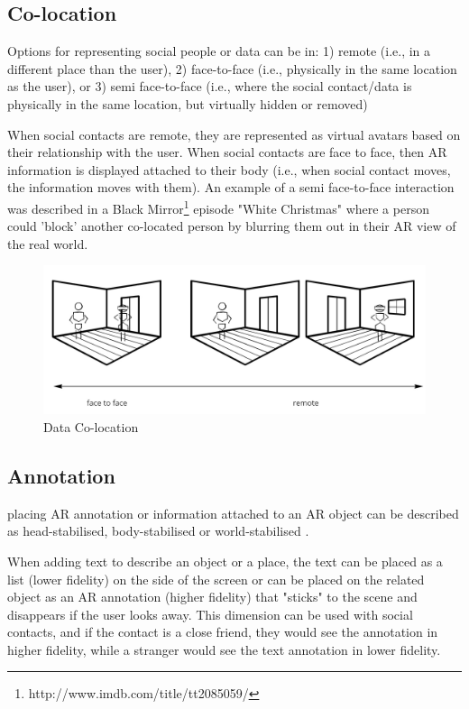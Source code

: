 \subsection{Co-location}

Options for representing social people or data can be in: 
1) remote (i.e., in a different place than the user), 
2) face-to-face (i.e., physically in the same location as the user), or 
3) semi face-to-face (i.e., where the social contact/data is physically in the same location, but virtually hidden or removed)

When social contacts are remote, they are represented as virtual avatars based on their relationship with the user. When social contacts are face to face, then AR information is displayed attached to their body (i.e., when social contact moves, the information moves with them). 
An example of a semi face-to-face interaction was described in a Black Mirror\footnote{http://www.imdb.com/title/tt2085059/} episode "White Christmas" where a person could 'block' another co-located person by blurring them out in their AR view of the real world.

\begin{figure}[h]
    \centering
    \includegraphics[width=.8\linewidth]{images/continuum-colocation.jpg}
    \caption{Data Co-location}
    \label{fig:continuum:data-colocation}
\end{figure}


\subsection{Annotation}

placing AR annotation or information attached to an AR object can be described as head-stabilised, body-stabilised or world-stabilised \cite{Billinghurst1998}.

When adding text to describe an object or a place, the text can be placed as a list (lower fidelity) on the side of the screen or can be placed on the related object as an AR annotation (higher fidelity) that "sticks" to the scene and disappears if the user looks away. This dimension can be used with social contacts, and if the contact is a close friend, they would see the annotation in higher fidelity, while a stranger would see the text annotation in lower fidelity. 

